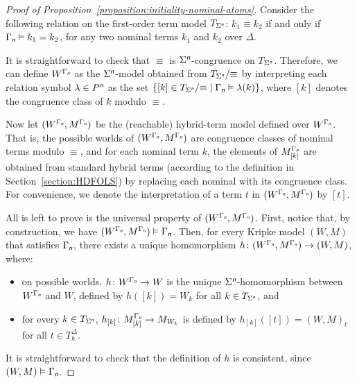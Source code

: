 \documentclass[a4paper,UKenglish,cleveref, autoref]{lipics-v2019}
\newcommand{\HDCLS}{{\mathsf{HDCLS}}}
\renewcommand{\models}{\vDash}
\newcommand{\keyscript}[1]{\text{\normalfont\sffamily\itshape #1}}
\newcommand{\nominal}{\keyscript{n}}
\newcommand{\rigid}{\keyscript{r}}
\begin{document}
\begin{proof}[Proof of Proposition~\ref{proposition:initiality-nominal-atoms}]
  Consider the following relation on the first-order term model \(T_{\Sigma^{\nominal}}\):
  \(k_{1} \equiv k_{2}\) if and only if \(\Gamma_{\nominal} \models k_{1} = k_{2}\), for any two nominal terms \(k_{1}\) and \(k_{2}\) over \(\Delta\).

  It is straightforward to check that \(\equiv\) is \(\Sigma^{\nominal}\)-congruence on \(T_{\Sigma^{\nominal}}\).
  Therefore, we can define \(W^{\Gamma_{\nominal}}\) as the \(\Sigma^{\nominal}\)-model obtained from \(T_{\Sigma^{\nominal}} /{\equiv}\) by interpreting each relation symbol \(\lambda \in P^{\nominal}\) as the set \(\{ [k] \in T_{\Sigma^{\nominal}} /{\equiv} \mid \Gamma_{\nominal} \models \lambda(k) \}\), where \([k]\) denotes the congruence class of \(k\) modulo \(\equiv\).

  Now let \((W^{\Gamma_{\nominal}}, M^{\Gamma_{\nominal}})\) be the (reachable) hybrid-term model defined over \(W^{\Gamma_{\nominal}}\).
  That is, the possible worlds of \((W^{\Gamma_{\nominal}}, M^{\Gamma_{\nominal}})\) are congruence classes of nominal terms modulo \(\equiv\), and for each nominal term \(k\), the elements of \(M^{\Gamma_{\nominal}}_{[k]}\) are obtained from standard hybrid terms (according to the definition in Section~\ref{section:HDFOLS}) by replacing each nominal with its congruence class.
  For convenience, we denote the interpretation of a term \(t\) in \((W^{\Gamma_{\nominal}}, M^{\Gamma_{\nominal}})\) by \([t]\).

  All is left to prove is the universal property of \((W^{\Gamma_{\nominal}}, M^{\Gamma_{\nominal}})\).
  First, notice that, by construction, we have \((W^{\Gamma_{\nominal}}, M^{\Gamma_{\nominal}}) \models \Gamma_{\nominal}\).
  Then, for every Kripke model \((W, M)\) that satisfies \(\Gamma_{\nominal}\), there exists a unique homomorphism \(h \colon (W^{\Gamma_{\nominal}}, M^{\Gamma_{\nominal}}) \to (W, M)\), where:
  \begin{itemize}
  \item on possible worlds, \(h \colon W^{\Gamma_{\nominal}} \to W\) is the unique \(\Sigma^{\nominal}\)-homomorphism between \(W^{\Gamma_{\nominal}}\) and \(W\), defined by \(h([k]) = W_{k}\) for all \(k \in T_{\Sigma^{\nominal}}\), and 

  \item for every \(k \in T_{\Sigma^{\nominal}}\), \(h_{[k]} \colon M^{\Gamma_{\nominal}}_{[k]} \to M_{W_{k}}\) is defined by \(h_{[k]}([t]) = (W, M)_{t}\) for all \(t \in T^{\Delta}_{k}\).
  \end{itemize}
  It is straightforward to check that the definition of \(h\) is consistent, since \((W, M) \models \Gamma_{\nominal}\).
\end{proof}
\end{document}
